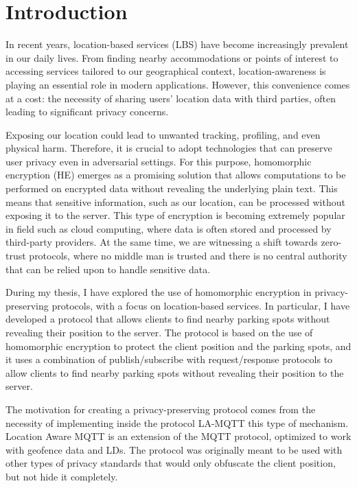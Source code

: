 \chapter{Introduction} \label{chap:intro}

%
%

In recent years, location-based services (LBS) have become increasingly prevalent in our daily lives. From finding nearby accommodations or points of interest to accessing services tailored to our geographical context, location-awareness is playing an essential role in modern applications. However, this convenience comes at a cost: the necessity of sharing users' location data with third parties, often leading to significant privacy concerns.

Exposing our location could lead to unwanted tracking, profiling, and even physical harm. Therefore, it is crucial to adopt technologies that can preserve user privacy even in adversarial settings. For this purpose, homomorphic encryption (HE) emerges as a promising solution that allows computations to be performed on encrypted data without revealing the underlying plain text. This means that sensitive information, such as our location, can be processed without exposing it to the server. This type of encryption is becoming extremely popular in field such as cloud computing, where data is often stored and processed by third-party providers. 
At the same time, we are witnessing a shift towards zero-trust protocols, where no middle man is trusted and there is no central authority that can be relied upon to handle sensitive data. 


During my thesis, I have explored the use of homomorphic encryption in privacy-preserving protocols, with a focus on location-based services. In particular, I have developed a protocol that allows clients to find nearby parking spots without revealing their position to the server. The protocol is based on the use of homomorphic encryption to protect the client position and the parking spots, and it uses a combination of publish/subscribe with request/response protocols to allow clients to find nearby parking spots without revealing their position to the server.

The motivation for creating a privacy-preserving protocol comes from the necessity of implementing inside the protocol LA-MQTT this type of mechanism. Location Aware MQTT is an extension of the MQTT protocol, optimized to work with geofence data and LDs. The protocol was originally meant to be used with other types of privacy standards that would only obfuscate the client position, but not hide it completely.
